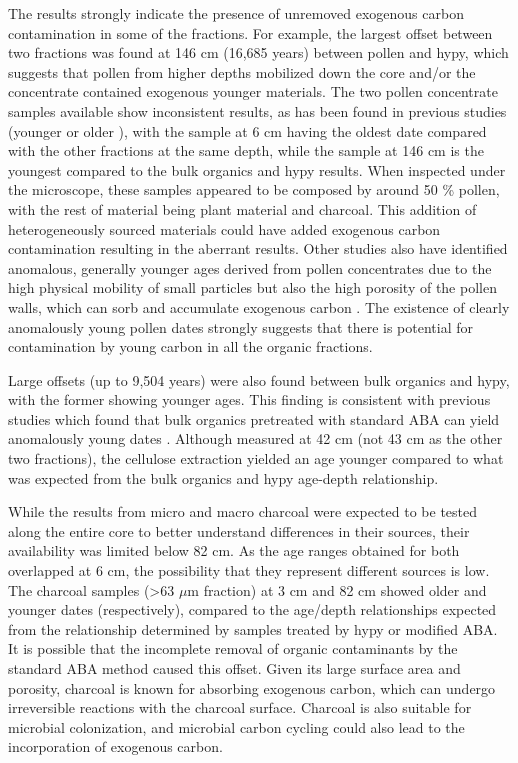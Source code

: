 \documentclass[
  12pt,
]{book}
\begin{document}
The results strongly indicate the presence of unremoved exogenous carbon contamination in some of the fractions. For example, the largest offset between two fractions was found at 146 cm (16,685 years) between pollen and hypy, which suggests that pollen from higher depths mobilized down the core and/or the concentrate contained exogenous younger materials. The two pollen concentrate samples available show inconsistent results, as has been found in previous studies (younger \citep{fieldUntanglingGeochronologicalComplexity2018, mayEstablishingChronologicalFramework2018} or older \citep{neuliebPotentialPitfallsPollen2013, fletcherAMSRadiocarbonDating2017}), with the sample at 6 cm having the oldest date compared with the other fractions at the same depth, while the sample at 146 cm is the youngest compared to the bulk organics and hypy results. When inspected under the microscope, these samples appeared to be composed by around 50 \% pollen, with the rest of material being plant material and charcoal. This addition of heterogeneously sourced materials could have added exogenous carbon contamination resulting in the aberrant results. Other studies also have identified anomalous, generally younger ages derived from pollen concentrates \citep{mayEstablishingChronologicalFramework2018, clymoUpwashDownwashPollen1987} due to the high physical mobility of small particles but also the high porosity of the pollen walls, which can sorb and accumulate exogenous carbon \citep{kilianProblematic14CAMSDates2002a}. The existence of clearly anomalously young pollen dates strongly suggests that there is potential for contamination by young carbon in all the organic fractions.

Large offsets (up to 9,504 years) were also found between bulk organics and hypy, with the former showing younger ages. This finding is consistent with previous studies which found that bulk organics pretreated with standard ABA can yield anomalously young dates \citep{wangRadiocarbonDatingSoil1996, wustComparisonRadiocarbonAges2008, pessendaRadiocarbonDatingTotal2001}. Although measured at 42 cm (not 43 cm as the other two fractions), the cellulose extraction yielded an age younger compared to what was expected from the bulk organics and hypy age-depth relationship.

While the results from micro and macro charcoal were expected to be tested along the entire core to better understand differences in their sources, their availability was limited below 82 cm. As the age ranges obtained for both overlapped at 6 cm, the possibility that they represent different sources is low. The charcoal samples (\textgreater63 \(\mu\)m fraction) at 3 cm and 82 cm showed older and younger dates (respectively), compared to the age/depth relationships expected from the relationship determined by samples treated by hypy or modified ABA. It is possible that the incomplete removal of organic contaminants by the standard ABA method caused this offset. Given its large surface area and porosity, charcoal is known for absorbing exogenous carbon, which can undergo irreversible reactions with the charcoal surface. Charcoal is also suitable for microbial colonization, and microbial carbon cycling could also lead to the incorporation of exogenous carbon.
\end{document}
